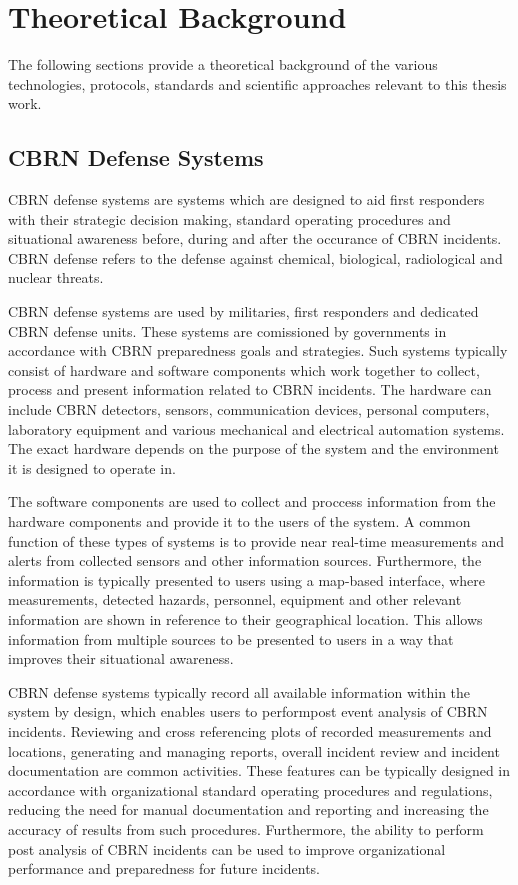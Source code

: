 \section{Theoretical Background}
The following sections provide a theoretical background of the various technologies, protocols, standards and scientific approaches relevant to this thesis work.
\subsection{CBRN Defense Systems}
CBRN defense systems are systems which are designed to aid first responders with their strategic decision making, standard operating procedures and situational awareness before, during and after the occurance of CBRN incidents. CBRN defense refers to the defense against chemical, biological, radiological and nuclear threats. \par
CBRN defense systems are used by militaries, first responders and dedicated CBRN defense units. These systems are comissioned by governments in accordance with CBRN preparedness goals and strategies. Such systems typically consist of hardware and software components which work together to collect, process and present information related to CBRN incidents. The hardware can include CBRN detectors, sensors, communication devices, personal computers, laboratory equipment and various mechanical and electrical automation systems. The exact hardware depends on the purpose of the system and the environment it is designed to operate in.~\citep{PolicastroA.J.2008_itP,alma991972120506254}
\par
The software components are used to collect and proccess information from the hardware components and provide it to the users of the system. A common function of these types of systems is to provide near real-time measurements and alerts from collected sensors and other information sources. Furthermore, the information is typically presented to users using a map-based interface, where measurements, detected hazards, personnel, equipment and other relevant information are shown in reference to their geographical location. This allows information from multiple sources to be presented to users in a way that improves their  situational awareness.
\par
CBRN defense systems typically record all available information within the system by design, which enables users to performpost event analysis of CBRN incidents. Reviewing and cross referencing plots of recorded measurements and locations, generating and managing reports, overall incident review and incident documentation are common activities. These features can be typically designed in accordance with organizational standard operating procedures and regulations, reducing the need for manual documentation and reporting and increasing the accuracy of results from such procedures. Furthermore, the ability to perform post analysis of CBRN incidents can be used to improve organizational performance and preparedness for future incidents.
